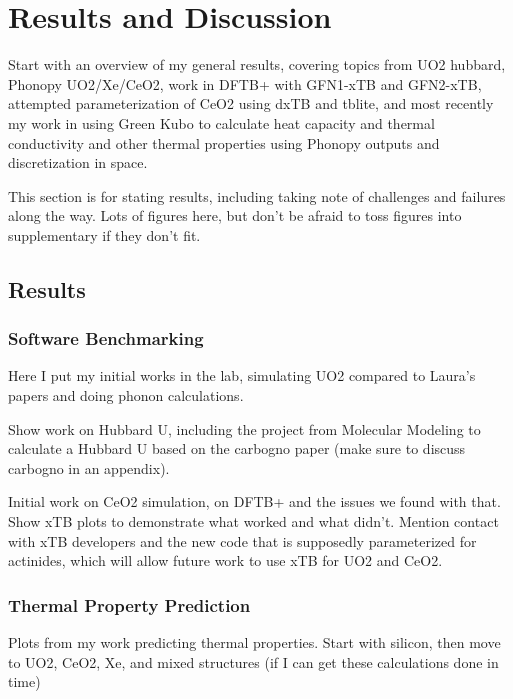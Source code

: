 
\chapter{Results and Discussion}

Start with an overview of my general results, covering topics from UO2 hubbard, Phonopy UO2/Xe/CeO2, work in DFTB+ with GFN1-xTB and GFN2-xTB, attempted parameterization of CeO2 using dxTB and tblite, and most recently my work in using Green Kubo to calculate heat capacity and thermal conductivity and other thermal properties using Phonopy outputs and discretization in space. 

This section is for stating results, including taking note of challenges and failures along the way. Lots of figures here, but don't be afraid to toss figures into supplementary if they don't fit.

\section{Results}

\subsection{Software Benchmarking}

Here I put my initial works in the lab, simulating UO2 compared to Laura's papers and doing phonon calculations. 

Show work on Hubbard U, including the project from Molecular Modeling to calculate a Hubbard U based on the carbogno paper (make sure to discuss carbogno in an appendix). 

Initial work on CeO2 simulation, on DFTB+ and the issues we found with that. Show xTB plots to demonstrate what worked and what didn't. Mention contact with xTB developers and the new code that is supposedly parameterized for actinides, which will allow future work to use xTB for UO2 and CeO2.

\subsection{Thermal Property Prediction}

Plots from my work predicting thermal properties. Start with silicon, then move to UO2, CeO2, Xe, and mixed structures (if I can get these calculations done in time)

